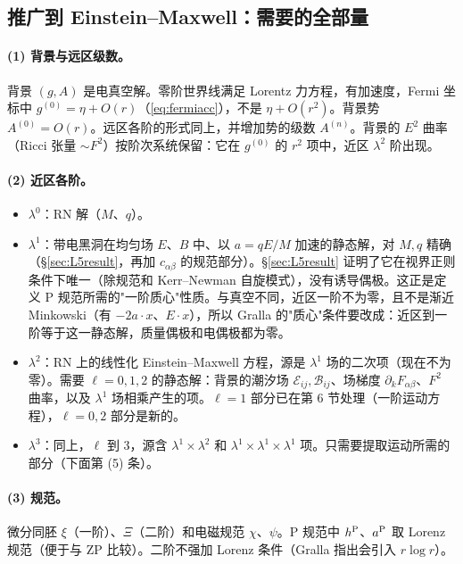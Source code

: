 \documentclass[11pt,a4paper]{ctexart}
\numberwithin{equation}{section}
\begin{document}
\subsection{推广到 Einstein--Maxwell：需要的全部量}
\label{sec:L6list}

\paragraph{(1) 背景与远区级数。}背景 $(g,A)$ 是电真空解。零阶世界线满足 Lorentz 力方程，有加速度，Fermi 坐标中 $g^{(0)}=\eta+O(r)$（\eqref{eq:fermiacc}），不是 $\eta+O(r^2)$。背景势 $A^{(0)}=O(r)$。远区各阶的形式同上，并增加势的级数 $A^{(n)}$。背景的 $E^2$ 曲率（Ricci 张量 $\sim F^2$）按阶次系统保留：它在 $g^{(0)}$ 的 $r^2$ 项中，近区 $\lambda^2$ 阶出现。

\paragraph{(2) 近区各阶。}
\begin{itemize}
\item $\lambda^0$：RN 解（$M$、$q$）。
\item $\lambda^1$：带电黑洞在均匀场 $E$、$B$ 中、以 $a=qE/M$ 加速的静态解，对 $M,q$ 精确（\S\ref{sec:L5result}，再加 $c_{\alpha\beta}$ 的规范部分）。\S\ref{sec:L5result} 证明了它在视界正则条件下唯一（除规范和 Kerr--Newman 自旋模式），没有诱导偶极。这正是定义 P 规范所需的"一阶质心"性质。与真空不同，近区一阶不为零，且不是渐近 Minkowski（有 $-2a\cdot x$、$E\cdot x$），所以 Gralla 的"质心"条件要改成：近区到一阶等于这一静态解，质量偶极和电偶极都为零。
\item $\lambda^2$：RN 上的线性化 Einstein--Maxwell 方程，源是 $\lambda^1$ 场的二次项（现在不为零）。需要 $\ell=0,1,2$ 的静态解：背景的潮汐场 $\mathcal E_{ij},\mathcal B_{ij}$、场梯度 $\partial_kF_{\alpha\beta}$、$F^2$ 曲率，以及 $\lambda^1$ 场相乘产生的项。$\ell=1$ 部分已在第 6 节处理（一阶运动方程），$\ell=0,2$ 部分是新的。
\item $\lambda^3$：同上，$\ell$ 到 3，源含 $\lambda^1\times\lambda^2$ 和 $\lambda^1\times\lambda^1\times\lambda^1$ 项。只需要提取运动所需的部分（下面第 (5) 条）。
\end{itemize}

\paragraph{(3) 规范。}微分同胚 $\xi$（一阶）、$\Xi$（二阶）和电磁规范 $\chi$、$\psi$。P 规范中 $h^{\rm P}$、$a^{\rm P}$ 取 Lorenz 规范（便于与 ZP 比较）。二阶不强加 Lorenz 条件（Gralla 指出会引入 $r\log r$）。
\end{document}
